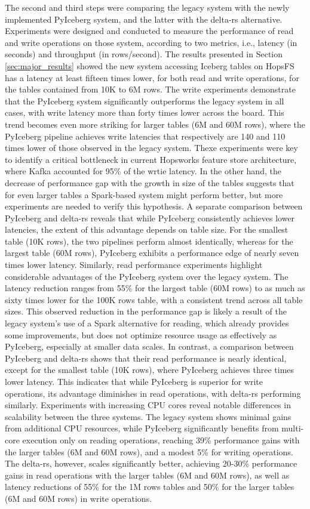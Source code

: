 The second and third steps were comparing the legacy system with the newly implemented PyIceberg system, and the latter with the delta-rs alternative. Experiments were designed and conducted to measure the performance of read and write operations on those system, according to two metrics, i.e., latency (in seconds) and throughput (in rows/second). The results presented in Section \ref{sec:major_results} showed the new system accessing Iceberg tables on \gls{HopsFS} has a latency at least fifteen times lower, for both read and write operations, for the tables contained from 10K to 6M rows. The write experiments demonstrate that the PyIceberg system significantly outperforms the legacy system in all cases, with write latency more than forty times lower across the board. This trend becomes even more striking for larger tables (6M and 60M rows), where the PyIceberg pipeline achieves write latencies that respectively are 140 and 110 times lower of those observed in the legacy system. Thexe experiments were key to identify a critical bottleneck in current Hopsworks feature store architecture, where Kafka accounted for 95\% of the wrtie latency. In the other hand, the decrease of performance gap with the growth in size of the tables suggests that for even larger tables a Spark-based system might perform better, but more experiments are needed to verify this hypothesis. A separate comparison between PyIceberg and delta-rs reveals that while PyIceberg consistently achieves lower latencies, the extent of this advantage depends on table size. For the smallest table (10K rows), the two pipelines perform almost identically, whereas for the largest table (60M rows), PyIceberg exhibits a performance edge of nearly seven times lower latency. Similarly, read performance experiments highlight considerable advantages of the PyIceberg system over the legacy system. The latency reduction ranges from 55\% for the largest table (60M rows) to as much as sixty times lower for the 100K rows table, with a consistent trend across all table sizes. This observed reduction in the performance gap is likely a result of the legacy system's use of a Spark alternative for reading, which already provides some improvements, but does not optimize resource usage as effectively as PyIceberg, especially at smaller data scales. In contrast, a comparison between PyIceberg and delta-rs shows that their read performance is nearly identical, except for the smallest table (10K rows), where PyIceberg achieves three times lower latency. This indicates that while PyIceberg is superior for write operations, its advantage diminishes in read operations, with delta-rs performing similarly. Experiments with increasing \gls{CPU} cores reveal notable differences in scalability between the three systems. The legacy system shows minimal gains from additional \gls{CPU} resources, while PyIceberg significantly benefits from multi-core execution only on reading operations, reaching 39\% performance gains with the larger tables (6M and 60M rows), and a modest 5\% for writing operations. The delta-rs, however, scales significantly better, achieving 20-30\% performance gains in read operations with the larger tables (6M and 60M rows), as well as latency reductions of 55\% for the 1M rows tables and 50\% for the larger tables (6M and 60M rows) in write operations.
